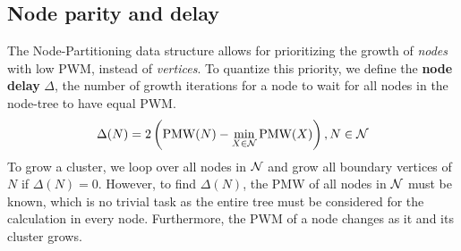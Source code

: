 


\subsection{Node parity and delay}\label{sec:paritydelaysus}

The Node-Partitioning data structure allows for prioritizing the growth of \emph{nodes} with low PWM, instead of \emph{vertices}. To quantize this priority, we define the \textbf{node delay} $
\Delta$, the number of growth iterations for a node to wait for all nodes in the node-tree to have equal PWM. 
\begin{equation}
    \Delta(N) = 2\left(\text{PMW}(N) - \min_{X\in\mathcal{N}}{\text{PMW}(X)}\right),  N \in \mathcal{N} 
\end{equation}
To grow a cluster, we loop over all nodes in $\mathcal{N}$ and grow all boundary vertices of $N$ if $\Delta(N)=0$. However, to find $\Delta(N)$, the PMW of all nodes in $\mathcal{N}$ must be known, which is no trivial task as the entire tree must be considered for the calculation in every node. Furthermore, the PWM of a node changes as it and its cluster grows. 

